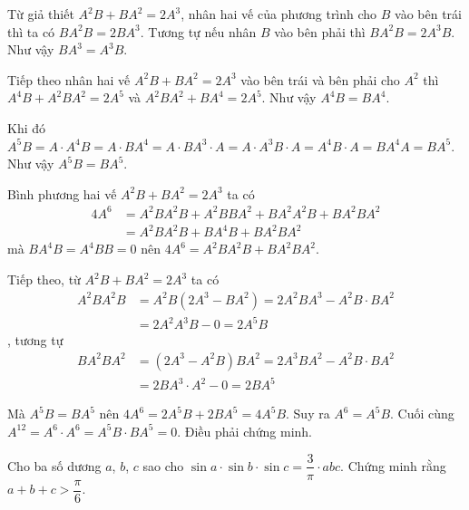 \begin{solution}
    Từ giả thiết $A^2 B + B A^2 = 2A^3$, nhân hai vế của phương
    trình cho $B$ vào bên trái thì ta có $B A^2 B = 2BA^3$. Tương
    tự nếu nhân $B$ vào bên phải thì $B A^2 B = 2A^3 B$. Như vậy
    $BA^3 = A^3 B$.

    Tiếp theo nhân hai vế $A^2 B + B A^2 = 2A^3$ vào bên trái và bên
    phải cho $A^2$ thì $A^4 B + A^2 B A^2 = 2A^5$ và $A^2 B A^2 
    + BA^4 = 2A^5$. Như vậy $A^4 B = B A^4$.

    Khi đó $A^5 B = A \cdot A^4 B = A \cdot BA^4 
    = A \cdot BA^3 \cdot A = A \cdot A^3 B \cdot A 
    = A^4 B \cdot A = B A^4 A = B A^5$. Như vậy $A^5 B = B A^5$.

    Bình phương hai vế $A^2 B + BA^2 = 2A^3$ ta có
    \begin{align*}
        4A^6 & = A^2 B A^2 B + A^2B BA^2 + BA^2 A^2 B + BA^2 BA^2 \\
            & = A^2 B A^2 B + BA^4 B + BA^2 BA^2
    \end{align*}
    mà $BA^4B = A^4 B B = 0$ nên $4A^6 = A^2B A^2B + BA^2 BA^2$.

    Tiếp theo, từ $A^2 B + BA^2 = 2A^3$ ta có
    \begin{align*}
        A^2B A^2B & = A^2B (2A^3 - BA^2) = 2 A^2 B A^3 - A^2 B \cdot BA^2
                \\ & = 2 A^2 A^3 B - 0 = 2 A^5 B
    \end{align*}
    , tương tự
    \begin{align*}
        BA^2 BA^2 & = (2A^3 - A^2B) BA^2 = 2A^3 BA^2 - A^2B \cdot BA^2
                \\ & = 2 BA^3 \cdot A^2 - 0 = 2BA^5
    \end{align*}

    Mà $A^5 B = BA^5$ nên $4A^6 = 2A^5B + 2BA^5 = 4A^5B$. Suy ra
    $A^6 = A^5 B$. Cuối cùng $A^{12} = A^6 \cdot A^6 = A^5B \cdot BA^5
    = 0$. Điều phải chứng minh.
\end{solution}

\begin{problem}[Bài 8]
    Cho ba số dương $a$, $b$, $c$ sao cho $\sin a \cdot \sin b \cdot
    \sin c = \dfrac{3}{\pi} \cdot abc$. Chứng minh rằng 
    $a + b + c > \dfrac{\pi}{6}$.
\end{problem}

